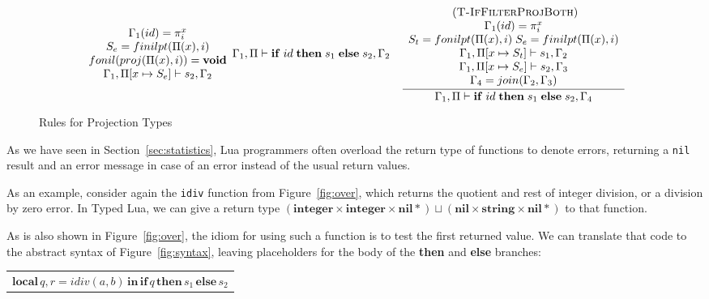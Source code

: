 \documentclass[preprint]{sigplanconf}
\newcommand{\Nil}{\mathbf{nil}}
\newcommand{\Integer}{\mathbf{integer}}
\newcommand{\String}{\mathbf{string}}
\newcommand{\mylabel}[1]{\; (\textsc{#1})}
\newcommand{\env}{\Gamma}
\newcommand{\penv}{\Pi}
\begin{document}
\begin{figure*}[t]
\[\begin{array}{c}
\begin{array}{c}
{\begin{array}{c}
	\env_{1}(id) = \pi_{i}^{x} \\
	 S_e = finilpt(\Pi(x), i)\\
	fonil(proj(\Pi(x), i)) = {\bf void} \\
	\env_{1}, \penv[x \mapsto S_e] \vdash s_{2}, \env_{2} 
	\end{array}}
{\env_{1}, \penv \vdash \mathbf{if} \; id \; \mathbf{then} \; s_{1} \; \mathbf{else} \; s_{2}, \env_{2}}
\end{array}
\begin{array}{c}
\mylabel{T-IfFilterProjBoth}\\
\dfrac{\begin{array}{c}
	\env_{1}(id) = \pi_{i}^{x} \\ S_t = fonilpt(\Pi(x), i) \; S_e = finilpt(\Pi(x), i)\\
	\env_{1}, \penv[x \mapsto S_t] \vdash s_{1}, \env_{2} \\
	\env_{1}, \penv[x \mapsto S_e] \vdash s_{2}, \env_{3} \\
	\env_{4} = join(\env_{2}, \env_{3}) 
	\end{array}}
{\env_{1}, \penv \vdash \mathbf{if} \; id \; \mathbf{then} \; s_{1} \; \mathbf{else} \; s_{2}, \env_{4}}
\end{array}
\end{array}
\]
\caption{Rules for Projection Types}
\end{figure*}

As we have seen in Section~\ref{sec:statistics}, Lua
programmers often overload the return type of functions
to denote errors, returning a {\tt nil} result and
an error message in case of an error instead of the
usual return values.

As an example, consider again the {\tt idiv} function
from Figure~\ref{fig:over}, which returns the quotient and rest of integer division, or a division by zero error. In Typed Lua, we can give a return type $(\Integer \times \Integer \times \Nil*) \sqcup (\Nil \times \String \times \Nil{*})$ to that function. 

As is also shown in Figure~\ref{fig:over}, the idiom for using such
a function is to test the first returned value. We
can translate that code to the abstract syntax of
Figure~\ref{fig:syntax}, leaving placeholders for
the body of the {\bf then} and {\bf else} branches:
\begin{center}
	\begin{tabular}{ll}
		\multicolumn{2}{l}{$\mathbf{local} \, q, r = idiv(a, b) \, \mathbf{in} \, \mathbf{if} \, q \, \mathbf{then} \, s_1 \, \mathbf{else} \, s_2$}
	\end{tabular}
\end{center}
\end{document}
